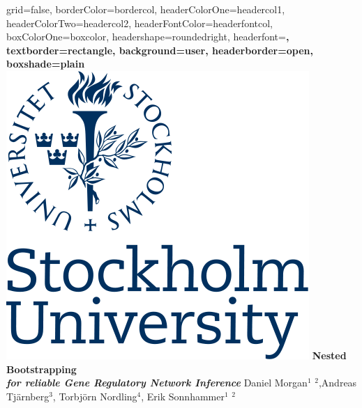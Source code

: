 \documentclass[a0paper,portrait]{baposter}
\begin{document}
\begin{poster}{
grid=false,
borderColor=bordercol, %
headerColorOne=headercol1, %
headerColorTwo=headercol2, %
headerFontColor=headerfontcol, %
boxColorOne=boxcolor, %
headershape=roundedright, %
headerfont=\Large\sf\bf, %
textborder=rectangle,
background=user,
headerborder=open, %
boxshade=plain
}
{\includegraphics[scale=0.15]{logo.png}}
%
%
{ \bf  \huge {Nested Bootstrapping} \\  \it for reliable Gene Regulatory Network Inference } %
{\vspace{0.3em} \smaller Daniel Morgan$^1$ $^2$,Andreas Tj\"{a}rnberg$^3$, Torbj\"{o}rn  Nordling$^4$, Erik Sonnhammer$^1$ $^2$   \\  %
%
%
  
}
\end{poster}
\end{document}
